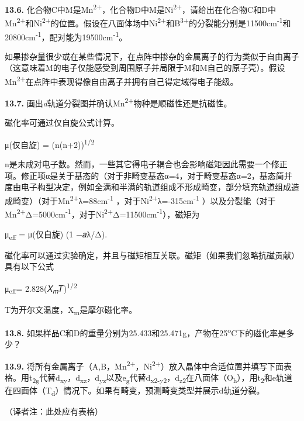 \textbf{13.6.}
化合物C中M是Mn\textsuperscript{2+}，化合物D中M是Ni\textsuperscript{2+}，请给出在化合物C和D中Mn\textsuperscript{2+}和Ni\textsuperscript{2+}的位置。假设在八面体场中Ni\textsuperscript{2+}和B\textsuperscript{3+}的分裂能分别是11500cm\textsuperscript{-1}和20800cm\textsuperscript{-1}，配对能为19500cm\textsuperscript{-1}。

如果掺杂量很少或在某些情况下，在点阵中掺杂的金属离子的行为类似于自由离子（这意味着M的电子仅能感受到周围原子并局限于M和M自己的原子壳）。假设Mn\textsuperscript{2+}在点阵中表现得像自由离子并拥有自己得定域得电子能级。

\textbf{13.7.}
画出\emph{d}轨道分裂图并确认Mn\textsuperscript{2+}物种是顺磁性还是抗磁性。

磁化率可通过仅自旋公式计算。

μ(仅自旋) = (n(n+2))\textsuperscript{1/2}

n是未成对电子数。然而，一些其它得电子耦合也会影响磁矩因此需要一个修正项。修正项α是关于基态的（对于非畸变基态α=4，对于畸变基态α=2，基态简并度由电子构型决定，例如全满和半满的轨道组成不形成畸变，部分填充轨道组成造成畸变）（对于Mn\textsuperscript{2+}λ=88cm\textsuperscript{-1}
，对于Ni\textsuperscript{2+}λ=-315cm\textsuperscript{-1}
）以及分裂能（对于Mn\textsuperscript{2+}Δ=5000cm\textsuperscript{-1}，对于Ni\textsuperscript{2+}Δ=11500cm\textsuperscript{-1}），磁矩为

μ\textsubscript{eff} = μ(仅自旋) (1 −𝑎λ/Δ).

磁化率可以通过实验确定，并且与磁矩相互关联。磁矩（如果我们忽略抗磁贡献）具有以下公式

μ\textsubscript{eff}= 2.828(𝑋\textsubscript{𝑚}𝑇)\textsuperscript{1/2}

T为开尔文温度，X\textsubscript{m}是摩尔磁化率。

\textbf{13.8.}
如果样品C和D的重量分别为25.433和25.471g，产物在25\textsuperscript{o}C下的磁化率是多少？

\textbf{13.9.}
将所有金属离子（A,B，Mn\textsuperscript{2+}，Ni\textsuperscript{2+}）放入晶体中合适位置并填写下面表格。用t\textsubscript{2g}代替d\textsubscript{xy}，d\textsubscript{xz}，d\textsubscript{yz}以及e\textsubscript{g}代替d\textsubscript{x2-y2}，d\textsubscript{z2}在八面体（O\textsubscript{h}），用t\textsubscript{2}和e轨道在四面体（T\textsubscript{d}）情况下。如果有畸变，预测畸变类型并展示d轨道分裂。

（译者注：此处应有表格）
